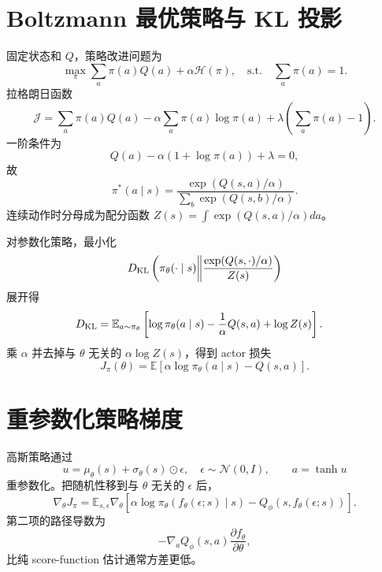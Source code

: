 \documentclass[11pt]{article}
\numberwithin{equation}{section}
\newcommand{\E}{\mathbb{E}}
\newcommand{\1}{\mathbf{1}}
\newcommand{\cN}{\mathcal{N}}
\begin{document}
\section{Boltzmann 最优策略与 KL 投影}

固定状态和 $Q$，策略改进问题为
\begin{equation}
 \max_\pi\sum_a\pi(a)Q(a)+\alpha\mathcal H(\pi),
 \quad\text{s.t.}\quad\sum_a\pi(a)=1.
\end{equation}
拉格朗日函数
\begin{equation}
 \mathcal J=\sum_a\pi(a)Q(a)-\alpha\sum_a\pi(a)\log\pi(a)
 +\lambda\left(\sum_a\pi(a)-1\right).
\end{equation}
一阶条件为
\begin{equation}
 Q(a)-\alpha(1+\log\pi(a))+\lambda=0,
\end{equation}
故
\begin{equation}
 \pi^*(a\mid s)=\frac{\exp(Q(s,a)/\alpha)}
 {\sum_b\exp(Q(s,b)/\alpha)}.
\end{equation}
连续动作时分母成为配分函数
$Z(s)=\int\exp(Q(s,a)/\alpha)da$。

对参数化策略，最小化
\begin{equation}
 D_{\rm KL}\left(\pi_\theta(\cdot\mid s)\middle\|
 \frac{\exp(Q(s,\cdot)/\alpha)}{Z(s)}\right)
\end{equation}
展开得
\begin{align}
 D_{\rm KL}
 &=\E_{a\sim\pi_\theta}
 \left[\log\pi_\theta(a\mid s)-\frac1\alpha Q(s,a)+\log Z(s)\right].
\end{align}
乘 $\alpha$ 并去掉与 $\theta$ 无关的 $\alpha\log Z(s)$，得到 actor 损失
\begin{equation}
 \boxed{J_\pi(\theta)=\E[\alpha\log\pi_\theta(a\mid s)-Q(s,a)].}
\end{equation}

\section{重参数化策略梯度}

高斯策略通过
\begin{equation}
 u=\mu_\theta(s)+\sigma_\theta(s)\odot\epsilon,
 \quad\epsilon\sim\cN(0,I),\qquad a=\tanh u
\end{equation}
重参数化。把随机性移到与 $\theta$ 无关的 $\epsilon$ 后，
\begin{equation}
 \nabla_\theta J_\pi
 =\E_{s,\epsilon}\nabla_\theta
 [\alpha\log\pi_\theta(f_\theta(\epsilon;s)\mid s)
 -Q_\phi(s,f_\theta(\epsilon;s))].
\end{equation}
第二项的路径导数为
\begin{equation}
 -\nabla_aQ_\phi(s,a)\frac{\partial f_\theta}{\partial\theta},
\end{equation}
比纯 score-function 估计通常方差更低。
\end{document}
